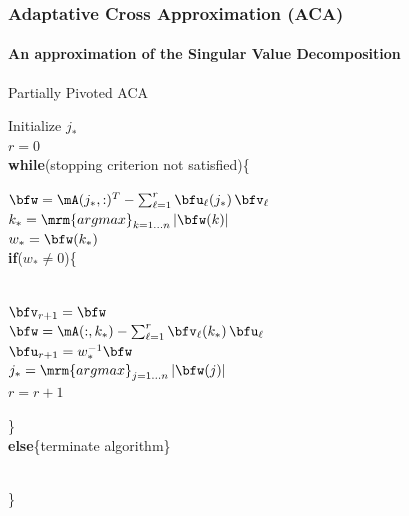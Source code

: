 
\begin{frame}
\frametitle{Adaptative Cross Approximation (ACA)}
\framesubtitle{An approximation of the Singular Value Decomposition} 
\begin{algorithm}[H]
  \caption{Partially Pivoted ACA}  
  Initialize $j_{*}$\\
  $r=0$\\
  \textbf{while}(stopping criterion not satisfied)\{\\
  \indent\hspace{0.5cm} \parbox{\linewidth}{
    $\bfw = \mA(j_{*},:)^{T} - \sum_{\ell=1}^{r}\bfu_{\ell}(j_{*})\,\bfv_{\ell}$\\
    $k_{*} = \mathop{\mrm{argmax}}_{k = 1\dots n}\vert \bfw(k)\vert$\\
    $w_{*} = \bfw(k_{*})$\\
    \textbf{if}($w_{*}\neq 0$)\{\\\quad\\
    \indent\hspace{0.5cm} \parbox{\linewidth}{
      $\bfv_{r+1} = \bfw$\\
      $\bfw = \mA(:,k_{*})-\sum_{\ell = 1}^{r}\bfv_{\ell}(k_{*})\,\bfu_{\ell} $\\
      $\bfu_{r+1} = w_{*}^{-1}\bfw$\\      
      $j_{*} = \mathop{\mrm{argmax}}_{j = 1\dots n} \vert \bfw(j)\vert$\\
      $r=r+1$
    }
   \}\\
    \textbf{else}\{terminate algorithm\}
    }\\
  \}

\end{algorithm}

\end{frame}


